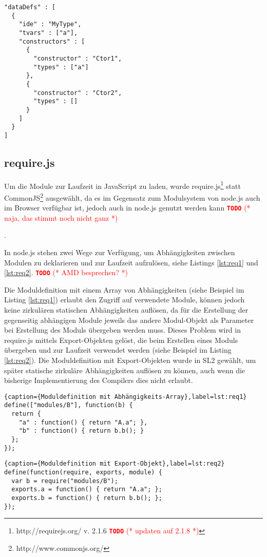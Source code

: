 \documentclass[runningheads]{llncs}
\newcommand{\TODO}[1]{ \textcolor{red}{\textbf{\texttt{\large{TODO}}} (* #1 *)}\par}
\begin{document}
\begin{verbatim}
"dataDefs" : [
  {
    "ide" : "MyType",
    "tvars" : ["a"],
    "constructors" : [
      {
        "constructor" : "Ctor1",
        "types" : ["a"]
      },
      {
        "constructor" : "Ctor2",
        "types" : []
      }
    ]
  }
]
\end{verbatim}

\subsection{require.js}
\label{sec:compReq}

Um die Module zur Laufzeit in JavaScript zu laden, wurde
require.js\footnote{http://requirejs.org/ v. 2.1.6 \TODO{updaten auf 2.1.8}}
statt CommonJS\footnote{http://www.commonjs.org/} ausgewählt, da es im
Gegensatz zum Modulsystem von node.js auch im Browser verfügbar ist,
jedoch auch in node.js genutzt werden kann\TODO{naja, das stimmt noch nicht ganz}.

In node.js stehen zwei Wege zur Verfügung, um Abhängigkeiten zwischen
Modulen zu deklarieren und zur Laufzeit aufzulösen, siehe Listings
\ref{lst:req1} und \ref{lst:req2}. \TODO{AMD besprechen?} Die
Moduldefinition mit einem Array von Abhängigkeiten (siehe Beispiel im
Listing \ref{lst:req1}) erlaubt den Zugriff auf verwendete Module,
können jedoch keine zirkulären statischen Abhängigkeiten auflösen, da
für die Erstellung der gegenseitig abhängigen Module jeweils das
andere Modul-Objekt als Parameter bei Erstellung des Moduls übergeben
werden muss. Dieses Problem wird in require.js mittels
Export-Objekten gelöst, die beim Erstellen eines Moduls übergeben und
zur Laufzeit verwendet werden (siehe Beispiel im Listing
\ref{lst:req2}). Die Moduldefinition mit Export-Objekten wurde in SL2
gewählt, um später statische zirkuläre Abhängigkeiten auflösen zu
können, auch wenn die bisherige Implementierung des Compilers dies
nicht erlaubt.

\begin{lstlisting}{caption={Moduldefinition mit Abhängigkeits-Array},label=lst:req1}
define(["modules/B"], function(b) {
  return {
    "a" : function() { return "A.a"; },
    "b" : function() { return b.b(); }
  };
});
\end{lstlisting}

\begin{lstlisting}{caption={Moduldefinition mit Export-Objekt},label=lst:req2}
define(function(require, exports, module) {
  var b = require("modules/B");
  exports.a = function() { return "A.a"; };
  exports.b = function() { return b.b(); };
});
\end{lstlisting}
\end{document}
